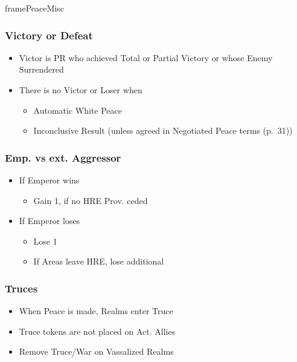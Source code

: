 \documentclass[10pt]{article}
\begin{document}
\begin{dynamiccontents*}{framePeaceMisc}
	\begin{multicols}{2}
		\subsubsection*{Victory or Defeat }
		\begin{itemize}
			\item Victor is PR who achieved Total or Partial Victory or whose Enemy Surrendered
			\item There is no Victor or Loser when
			\begin{itemize}
				\item Automatic White Peace
				\item Inconclusive Result (unless agreed in Negotiated Peace terms (p.~31))
			\end{itemize}
		\end{itemize}

			\columnbreak
		\subsubsection*{Emp. vs ext. Aggressor }
		\begin{itemize}
			\item If Emperor wins
			\begin{itemize}
				\item Gain 1\authority, if no HRE Prov. ceded
			\end{itemize}
			\item If Emperor loses
			\begin{itemize}
				\item Lose 1\authority
				\item If Areas leave HRE, lose additional \authority
			\end{itemize}
		\end{itemize}

		\subsubsection*{Truces }
		\begin{itemize}
			\item When Peace is made, Realms enter Truce
			\item Truce tokens are not placed on Act. Allies
			\item Remove Truce/War on Vassalized Realms
		\end{itemize}
	\end{multicols}
\end{dynamiccontents*}%
\end{document}
